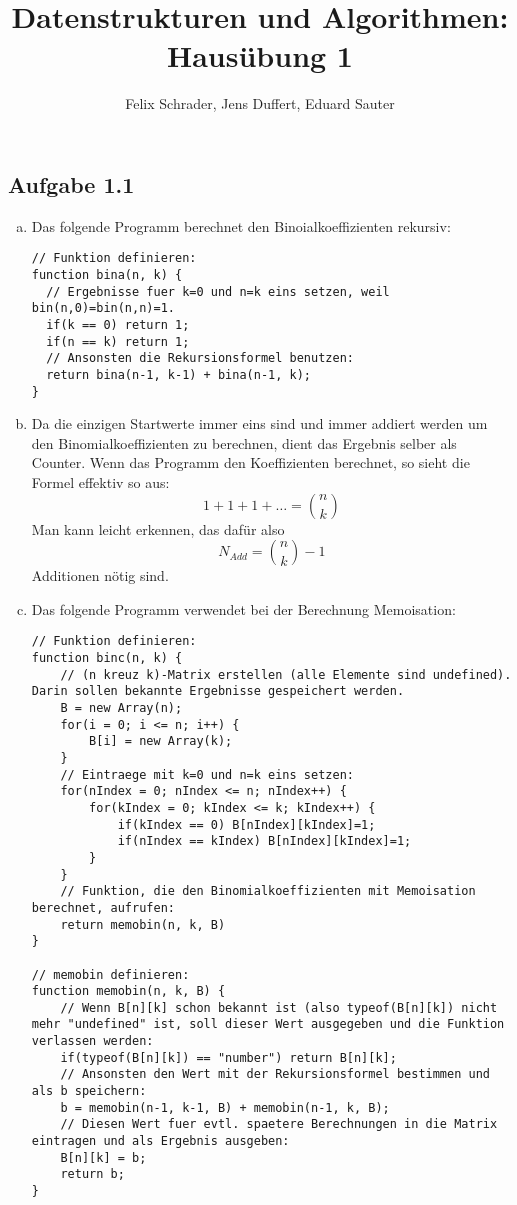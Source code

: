 \documentclass[11pt]{article}
\author{Felix Schrader, Jens Duffert, Eduard Sauter}
\title{Datenstrukturen und Algorithmen: Haus\"ubung 1}
\begin{document}
\maketitle

\subsection*{Aufgabe 1.1}
\begin{enumerate}[a)]

\item Das folgende Programm berechnet den Binoialkoeffizienten rekursiv:

\begin{lstlisting}
// Funktion definieren:
function bina(n, k) {
  // Ergebnisse fuer k=0 und n=k eins setzen, weil bin(n,0)=bin(n,n)=1.
  if(k == 0) return 1;
  if(n == k) return 1;
  // Ansonsten die Rekursionsformel benutzen:
  return bina(n-1, k-1) + bina(n-1, k);
}
\end{lstlisting}

\item Da die einzigen Startwerte immer eins sind und immer addiert werden um den Binomialkoeffizienten zu berechnen, dient das Ergebnis selber als Counter. Wenn das Programm den Koeffizienten berechnet, so sieht die Formel effektiv so aus:\[ 1+1+1+\dots =\binom{n}{k} \]
Man kann leicht erkennen, das daf\"ur also
\begin{equation}
N_{Add}=\binom{n}{k}-1
\end{equation}
Additionen n\"otig sind.

\item Das folgende Programm verwendet bei der Berechnung Memoisation:

\begin{lstlisting}
// Funktion definieren:
function binc(n, k) {
    // (n kreuz k)-Matrix erstellen (alle Elemente sind undefined). Darin sollen bekannte Ergebnisse gespeichert werden.
    B = new Array(n);
    for(i = 0; i <= n; i++) {
        B[i] = new Array(k);
    }
    // Eintraege mit k=0 und n=k eins setzen:
    for(nIndex = 0; nIndex <= n; nIndex++) {
        for(kIndex = 0; kIndex <= k; kIndex++) {
            if(kIndex == 0) B[nIndex][kIndex]=1;
            if(nIndex == kIndex) B[nIndex][kIndex]=1;
        }
    }
    // Funktion, die den Binomialkoeffizienten mit Memoisation berechnet, aufrufen:
    return memobin(n, k, B)
}

// memobin definieren:
function memobin(n, k, B) {
    // Wenn B[n][k] schon bekannt ist (also typeof(B[n][k]) nicht mehr "undefined" ist, soll dieser Wert ausgegeben und die Funktion verlassen werden:
    if(typeof(B[n][k]) == "number") return B[n][k];
    // Ansonsten den Wert mit der Rekursionsformel bestimmen und als b speichern:
    b = memobin(n-1, k-1, B) + memobin(n-1, k, B);
    // Diesen Wert fuer evtl. spaetere Berechnungen in die Matrix eintragen und als Ergebnis ausgeben:
    B[n][k] = b;
    return b;
}
\end{lstlisting}

\end{enumerate}
\end{document}
